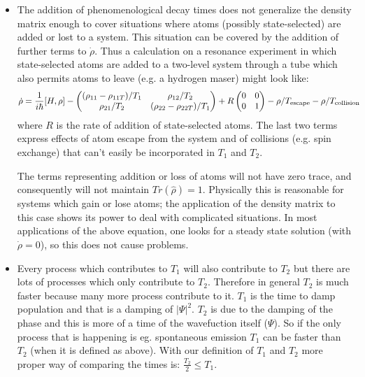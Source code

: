 \documentclass[AtomicOptical1Notes.tex]{subfiles}
\begin{document}
\begin{itemize}
			\item The addition of phenomenological decay times does not generalize the density matrix enough to cover situations where atoms (possibly state-selected) are added or lost to a system. This situation can be covered by the addition of further terms to $\dot{\rho}$. Thus a calculation on a resonance experiment in which state-selected atoms are added to a two-level system through a tube which also permits atoms to leave (e.g. a hydrogen maser) might look like: $$ \begin{aligned}  \dot{\rho} &= \frac{1}{i\hbar} [H, \rho] - \begin{pmatrix} (\rho_{11} - \rho_{11T})/T_1 & \rho_{12}/T_2 \\ \rho_{21}/T_2 & (\rho_{22}- \rho_{22T})/T_1 \end{pmatrix} +R \begin{pmatrix} 0 & 0 \\ 0 & 1 \end{pmatrix} - \rho /T_{\rm escape} - \rho /T_{\rm collision} \end{aligned} $$ where $R$ is the rate of addition of state-selected atoms. The last two terms express effects of atom escape from the system and of collisions (e.g. spin exchange) that can't easily be incorporated in $T_1$ and $T_2$.

The terms representing addition or loss of atoms will not have zero trace, and consequently will not maintain $Tr(\hat{\rho})=1$. Physically this is reasonable for systems which gain or lose atoms; the application of the density matrix to this case shows its power to deal with complicated situations. In most applications of the above equation, one looks for a steady state solution (with $\dot{\rho}=0$), so this does not cause problems.
			\item Every process which contributes to $T_1$ will also contribute to $T_2$ but there are lots of processes which only contribute to $T_2$. Therefore in general $T_2$ is much faster because many more process contribute to it. $T_1$ is the time to damp population and that is a damping of $|\Psi|^2$. $T_2$ is due to the damping of the phase and this is more of a time of the wavefuction itself ($\Psi$). So if the only process that is happening is eg. spontaneous emission $T_1$ can be faster than $T_2$ (when it is defined as above). With our definition of $T_1$ and $T_2$ more proper way of comparing the times is: $\frac{T_2}{2} \leq T_1$.
		\end{itemize}
\end{document}
